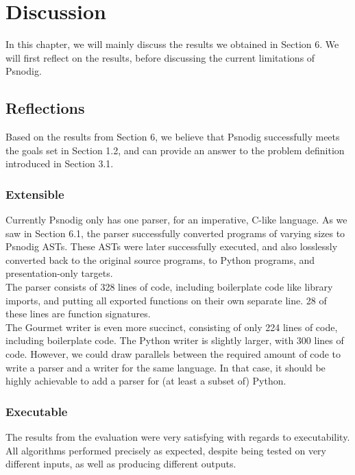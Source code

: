 \chapter{Discussion}

In this chapter, we will mainly discuss the results we obtained in Section 6. We will first reflect on the results, before discussing the current limitations of Psnodig.

\section{Reflections}

Based on the results from Section 6, we believe that Psnodig successfully meets the goals set in Section 1.2, and can provide an answer to the problem definition introduced in Section 3.1.

\subsection{Extensible}

Currently Psnodig only has one parser, for an imperative, C-like language. As we saw in Section 6.1, the parser successfully converted programs of varying sizes to Psnodig ASTs. These ASTs were later successfully executed, and also losslessly converted back to the original source programs, to Python programs, and presentation-only targets. \\

The parser consists of 328 lines of code, including boilerplate code like library imports, and putting all exported functions on their own separate line. 28 of these lines are function signatures. \\

The Gourmet writer is even more succinct, consisting of only 224 lines of code, including boilerplate code. The Python writer is slightly larger, with 300 lines of code. However, we could draw parallels between the required amount of code to write a parser and a writer for the same language. In that case, it should be highly achievable to add a parser for (at least a subset of) Python.

\subsection{Executable}

The results from the evaluation were very satisfying with regards to executability. All algorithms performed precisely as expected, despite being tested on very different inputs, as well as producing different outputs. \\

